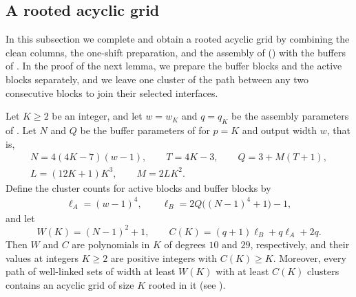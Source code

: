\documentclass[fontsize=12pt,leading=14pt]{fullpaper}
\newcounter{step}
\begin{document}
\subsection{A rooted acyclic grid}\label{sec:s3-parameters}

In this subsection we complete  and obtain a rooted acyclic grid by combining the clean columns, the one-shift preparation, and the assembly of  () with the buffers of .
In the proof of the next lemma, we prepare the buffer blocks and the active blocks separately, and we leave one cluster of the path between any two consecutive blocks to join their selected interfaces.

\begin{lemma}\label{lem:anchored-grid}
  Let $K\ge2$ be an integer, and let $w=w_K$ and $q=q_K$ be the assembly parameters of .
  Let $N$ and $Q$ be the buffer parameters of  for $p=K$ and output width $w$, that is,
  \begin{gather*}
    N=4(4K-7)(w-1),\qquad T=4K-3,\qquad Q=3+M(T+1),\\
    L=(12K+1)K^3,\qquad M=2LK^2.
  \end{gather*}
  Define the cluster counts for active blocks and buffer blocks by
  \begin{gather*}
    \ell_A=(w-1)^4,\qquad
    \ell_B=2Q\bigl((N-1)^4+1\bigr)-1,
  \end{gather*}
  and let
  \[
    W(K)=(N-1)^2+1,\qquad C(K)=(q+1)\ell_B+q\ell_A+2q.
  \]
  Then $W$ and $C$ are polynomials in $K$ of degrees $10$ and $29$, respectively, and their values at integers $K\ge2$ are positive integers with $C(K)\ge K$.
  Moreover, every path of well-linked sets of width at least $W(K)$ with at least $C(K)$ clusters contains an acyclic grid of size $K$ rooted in it (see ).
\end{lemma}
\end{document}
